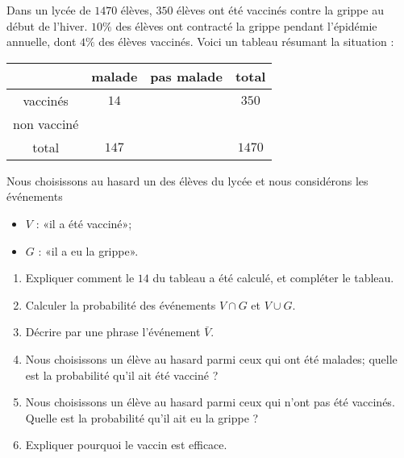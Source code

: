 

\begin{exercice}\label{exosmath-0716}

    \begin{multicols}{2}

Dans un lycée de $1470$ élèves, \( 350\) élèves ont été vaccinés contre la grippe au début de l'hiver. \( 10\%\) des élèves ont contracté la grippe pendant l'épidémie annuelle, dont \( 4\%\) des élèves vaccinés. Voici un tableau résumant la situation :

\begin{center}
    \begin{tabular}[]{|c|c|c|c|}
        \hline
        &malade&pas malade&total\\
        \hline
        vaccinés&\( 14\)&&\( 350\)\\
        \hline
        non vacciné&&&\\
        \hline
        total&\( 147\)&&\( 1470\)\\
        \hline
    \end{tabular}
\end{center}

    Nous choisissons au hasard un des élèves du lycée et nous considérons les événements 
    \begin{itemize}
        \item \( V\) : «il a été vacciné»; 
        \item \( G\) : «il a eu la grippe». 
    \end{itemize}
        

\begin{enumerate}
    \item
        Expliquer comment le \( 14\) du tableau a été calculé, et compléter le tableau.
    \item
        Calculer la probabilité des événements \( V\cap G\) et \( V\cup G\).
    \item
        Décrire par une phrase l'événement \( \bar V\).
    \item
        Nous choisissons un élève au hasard parmi ceux qui ont été malades; quelle est la probabilité qu'il ait été vacciné ?
    \item
        Nous choisissons un élève au hasard parmi ceux qui n'ont pas été vaccinés. Quelle est la probabilité qu'il ait eu la grippe ?
    \item
        Expliquer pourquoi le vaccin est efficace.
\end{enumerate}

    \end{multicols}

\end{exercice}
